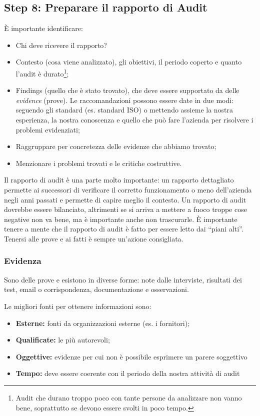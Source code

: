 \subsection{Step 8: Preparare il rapporto di Audit}

È importante identificare:
\begin{itemize}
\item Chi deve ricevere il rapporto?
\item Contesto (cosa viene analizzato), gli obiettivi, il periodo coperto e
quanto l'audit è durato\footnote{Audit che durano troppo poco con tante persone
da analizzare non vanno bene, soprattutto se devono essere svolti in poco
tempo.};
\item Findings (quello che è stato trovato), che deve essere supportato da delle
\emph{evidence} (prove). Le raccomandazioni possono essere date in due modi:
seguendo gli standard (es. standard ISO) o mettendo assieme la nostra
esperienza, la nostra conoscenza e quello che può fare l'azienda per risolvere i
problemi evidenziati;
\item Raggruppare per concretezza delle evidenze che abbiamo trovato;
\item Menzionare i problemi trovati e le critiche costruttive.
\end{itemize}

Il rapporto di audit è una parte molto importante: un rapporto dettagliato
permette ai successori di verificare il corretto funzionamento o meno
dell'azienda negli anni passati e permette di capire meglio il contesto. Un
rapporto di audit dovrebbe essere bilanciato, altrimenti se si arriva a mettere
a fuoco troppe cose negative non va bene, ma è importante anche non trascurarle.
È importante tenere a mente che il rapporto di audit è fatto per essere letto
dai ``piani alti''. Tenersi alle prove e ai fatti è sempre un'azione
consigliata.

\subsubsection{Evidenza}

Sono delle prove e esistono in diverse forme: note dalle interviste, risultati
dei test, email o corrispondenza, documentazione e osservazioni.

Le migliori fonti per ottenere informazioni sono:
\begin{itemize}
\item \textbf{Esterne:} fonti da organizzazioni esterne (es. i fornitori);
\item \textbf{Qualificate:} le più autorevoli;
\item \textbf{Oggettive:} evidenze per cui non è possibile esprimere un
parere soggettivo
\item \textbf{Tempo:} deve essere coerente con il periodo della nostra attività
di audit
\end{itemize}

